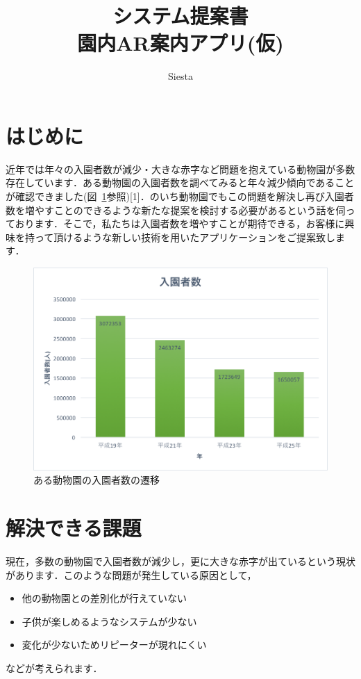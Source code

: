 \documentclass[a4j]{jarticle}
\title{
\vspace{30mm}
{\bf システム提案書} 
\\
\vspace{5mm}
{\bf 園内AR案内アプリ(仮)}
\vspace{90mm}
}
\author{
\vspace{5mm}
Siesta \\
}
\begin{document}
\maketitle

\newpage

\tableofcontents

\newpage

\section{はじめに}
近年では年々の入園者数が減少・大きな赤字など問題を抱えている動物園が多数存在しています．ある動物園の入園者数を調べてみると年々減少傾向であることが確認できました(図~\ref{nyuensya}参照)[1]．のいち動物園でもこの問題を解決し再び入園者数を増やすことのできるような新たな提案を検討する必要があるという話を伺っております．そこで，私たちは入園者数を増やすことが期待できる，お客様に興味を持って頂けるような新しい技術を用いたアプリケーションをご提案致します．

\begin{figure}[H]
	\begin{center}
		\includegraphics[width=0.5 \linewidth]{nyuensya.png}
		\caption{ある動物園の入園者数の遷移}
		\label{nyuensya}
	\end{center}
\end{figure}


\section{解決できる課題}
現在，多数の動物園で入園者数が減少し，更に大きな赤字が出ているという現状があります．このような問題が発生している原因として，
\begin{itemize}
	\item 他の動物園との差別化が行えていない
	\item 子供が楽しめるようなシステムが少ない
	\item 変化が少ないためリピーターが現れにくい
\end{itemize}
などが考えられます．
\end{document}
